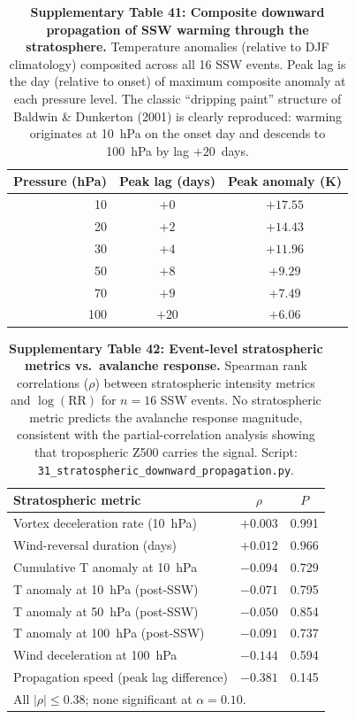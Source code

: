 \documentclass[11pt,letterpaper]{article}
\begin{document}
\begin{table}[!ht]
\centering
\caption{\textbf{Supplementary Table 41: Composite downward propagation of SSW warming through the stratosphere.} Temperature anomalies (relative to DJF climatology) composited across all 16 SSW events. Peak lag is the day (relative to onset) of maximum composite anomaly at each pressure level. The classic ``dripping paint'' structure of Baldwin \& Dunkerton (2001) is clearly reproduced: warming originates at 10~hPa on the onset day and descends to 100~hPa by lag $+20$~days.}
\label{tab:downward_prop}
\small
\begin{tabular}{rcc}
\toprule
Pressure (hPa) & Peak lag (days) & Peak anomaly (K) \\
\midrule
10  & $+0$  & $+17.55$ \\
20  & $+2$  & $+14.43$ \\
30  & $+4$  & $+11.96$ \\
50  & $+8$  & $+9.29$ \\
70  & $+9$  & $+7.49$ \\
100 & $+20$ & $+6.06$ \\
\bottomrule
\end{tabular}
\end{table}

\begin{table}[!ht]
\centering
\caption{\textbf{Supplementary Table 42: Event-level stratospheric metrics vs.\ avalanche response.} Spearman rank correlations ($\rho$) between stratospheric intensity metrics and $\log(\mathrm{RR})$ for $n = 16$ SSW events. No stratospheric metric predicts the avalanche response magnitude, consistent with the partial-correlation analysis showing that tropospheric Z500 carries the signal. Script: \texttt{31\_stratospheric\_downward\_propagation.py}.}
\label{tab:strat_correlations}
\small
\begin{tabular}{lcc}
\toprule
Stratospheric metric & $\rho$ & $P$ \\
\midrule
Vortex deceleration rate (10~hPa) & $+0.003$ & 0.991 \\
Wind-reversal duration (days) & $+0.012$ & 0.966 \\
Cumulative T anomaly at 10~hPa & $-0.094$ & 0.729 \\
T anomaly at 10~hPa (post-SSW) & $-0.071$ & 0.795 \\
T anomaly at 50~hPa (post-SSW) & $-0.050$ & 0.854 \\
T anomaly at 100~hPa (post-SSW) & $-0.091$ & 0.737 \\
Wind deceleration at 100~hPa & $-0.144$ & 0.594 \\
Propagation speed (peak lag difference) & $-0.381$ & 0.145 \\
\bottomrule
\multicolumn{3}{l}{\footnotesize All $|\rho| \leq 0.38$; none significant at $\alpha = 0.10$.} \\
\end{tabular}
\end{table}
\end{document}
